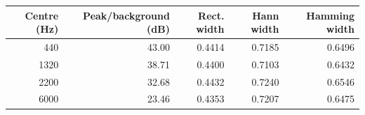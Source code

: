 \begin{tabular}{rrrrr}
\toprule
Centre (Hz) & Peak/background (dB) & Rect. width & Hann width & Hamming width \\
\midrule
440 & 43.00 & 0.4414 & 0.7185 & 0.6496 \\
1320 & 38.71 & 0.4400 & 0.7103 & 0.6432 \\
2200 & 32.68 & 0.4432 & 0.7240 & 0.6546 \\
6000 & 23.46 & 0.4353 & 0.7207 & 0.6475 \\
\bottomrule
\end{tabular}
